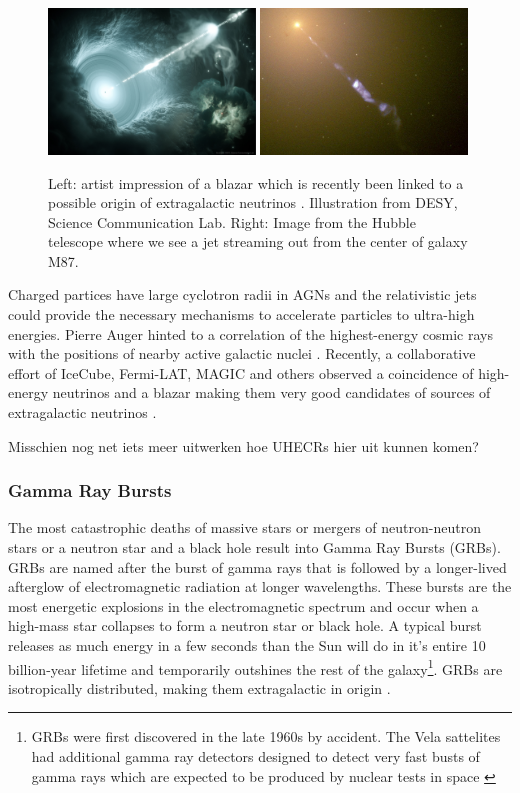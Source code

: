 \begin{figure}
\centering
\includegraphics[width=0.49\textwidth]{chapter3/img/quazar.jpg}
\includegraphics[width=0.49\textwidth]{chapter3/img/jet_crop.jpg}
\caption{Left: artist impression of a blazar which is recently been linked to a possible origin of extragalactic neutrinos \cite{TXS}. Illustration from DESY, Science Communication Lab. Right: Image from the Hubble telescope where we see a jet streaming out from the center of galaxy M87.}
\end{figure}

Charged partices have large cyclotron radii in AGNs and the relativistic jets could provide the necessary mechanisms to accelerate particles to ultra-high energies. Pierre Auger hinted to a correlation of the highest-energy cosmic rays with the positions of nearby active galactic nuclei \cite{Abraham:2007si}. Recently, a collaborative effort of IceCube, Fermi-LAT, MAGIC and others observed a coincidence of high-energy neutrinos and a blazar making them very good candidates of sources of extragalactic neutrinos \cite{IceCube:2018dnn}.

Misschien nog net iets meer uitwerken hoe UHECRs hier uit kunnen komen?
\subsubsection{Gamma Ray Bursts}
The most catastrophic deaths of massive stars or mergers of neutron-neutron stars or a neutron star and a black hole result into Gamma Ray Bursts (GRBs). GRBs are named after the burst of gamma rays that is followed by a longer-lived afterglow of electromagnetic radiation at longer wavelengths. These bursts are the most energetic explosions in the electromagnetic spectrum and occur when a high-mass star collapses to form a neutron star or black hole. A typical burst releases as much energy in a few seconds than the Sun will do in it's entire 10 billion-year lifetime and temporarily outshines the rest of the galaxy\footnote{GRBs were first discovered in the late 1960s by accident. The Vela sattelites had additional gamma ray detectors designed to detect very fast busts of gamma rays which are expected to be produced by nuclear tests in space \cite{Klebesadel:1973iq}}. GRBs are isotropically distributed, making them extragalactic in origin \cite{Meegan:1992xg}.

